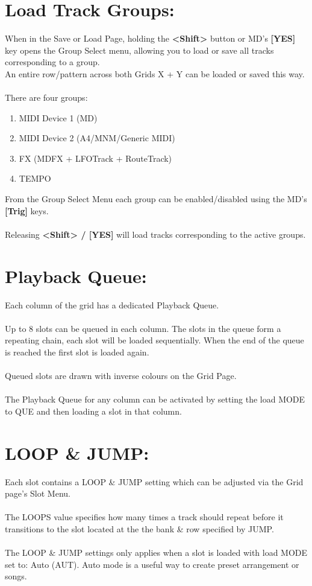 \section{Load Track Groups:}
When in the Save or Load Page, holding the \textbf{<Shift>} button or MD's \textbf{[YES]} key opens the Group Select menu,
allowing you to load or save all tracks corresponding to a group.\\An entire row/pattern across both Grids X + Y can be loaded or saved this way.\\
\\
There are four groups:
\begin{enumerate}
    \item MIDI Device 1 (MD)
    \item MIDI Device 2 (A4/MNM/Generic MIDI)
    \item FX (MDFX + LFOTrack + RouteTrack)
    \item TEMPO
\end{enumerate}
From the Group Select Menu each group can be enabled/disabled using the MD's \textbf{[Trig]} keys.\\
\\
Releasing \textbf{<Shift> / [YES]} will load tracks corresponding to the active groups.
\newpage

\section{Playback Queue:}
Each column of the grid has a dedicated Playback Queue.\\\\Up to 8 slots can be queued in each column.  The slots in the queue form a repeating chain, each slot will be loaded sequentially. When the end of the queue is reached the first slot is loaded again.\\\\Queued slots are drawn with inverse colours on the Grid Page.\\\\The Playback Queue for any column can be activated by setting the load MODE to QUE and then loading a slot in that column.

\section{LOOP \& JUMP:}
Each slot contains a LOOP \& JUMP setting which can be adjusted via the Grid page's Slot Menu.\\\\The LOOPS value specifies how many times a track should repeat before it transitions to the slot located at the the bank \& row specified by JUMP.
\\\\The LOOP \& JUMP settings only applies when a slot is loaded with load MODE set to: Auto (AUT). Auto mode is a useful way to create preset arrangement or songs.

